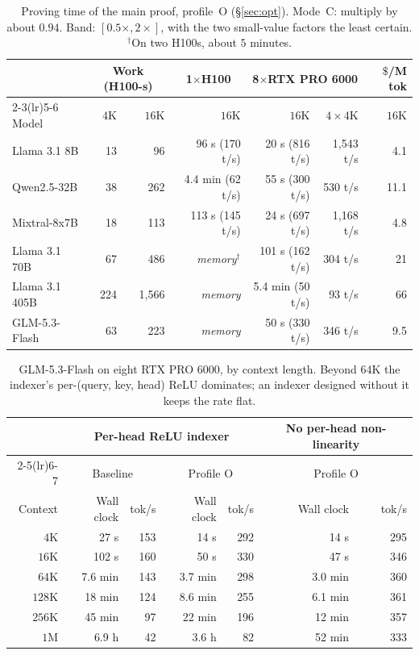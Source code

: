 \documentclass[11pt]{article}
\begin{document}
\begin{table}[h]
\centering\small
\begin{tabular}{@{}lrrrrrr@{}}
\toprule
& \multicolumn{2}{c}{Work (H100-s)} & \multicolumn{1}{c}{1\(\times\)H100} & \multicolumn{2}{c}{8\(\times\)RTX PRO 6000} & \(\$\)/M tok \\
\cmidrule(lr){2-3}\cmidrule(lr){5-6}
Model & \(4\)K & \(16\)K & \(16\)K & \(16\)K & \(4{\times}4\)K & \(16\)K \\
\midrule
Llama 3.1 8B & 13 & 96 & 96 s (170 t/s) & 20 s (816 t/s) & 1{,}543 t/s & 4.1 \\
Qwen2.5-32B & 38 & 262 & 4.4 min (62 t/s) & 55 s (300 t/s) & 530 t/s & 11.1 \\
Mixtral-8x7B & 18 & 113 & 113 s (145 t/s) & 24 s (697 t/s) & 1{,}168 t/s & 4.8 \\
Llama 3.1 70B & 67 & 486 & \emph{memory}\(^\dagger\) & 101 s (162 t/s) & 304 t/s & 21 \\
Llama 3.1 405B & 224 & 1{,}566 & \emph{memory} & 5.4 min (50 t/s) & 93 t/s & 66 \\
GLM-5.3-Flash & 63 & 223 & \emph{memory} & 50 s (330 t/s) & 346 t/s & 9.5 \\
\bottomrule
\end{tabular}
\caption{Proving time of the main proof, profile~O (\S\ref{sec:opt}). Mode~C: multiply by about \(0.94\). Band: \([0.5\times, 2\times]\), with the two small-value factors the least certain.
\(^\dagger\)On two H100s, about \(5\) minutes.}
\label{tab:proj-o}
\end{table}

\begin{table}[h]
\centering\small
\begin{tabular}{@{}rrrrrrr@{}}
\toprule
& \multicolumn{4}{c}{Per-head ReLU indexer} & \multicolumn{2}{c}{No per-head non-linearity} \\
\cmidrule(lr){2-5}\cmidrule(lr){6-7}
& \multicolumn{2}{c}{Baseline} & \multicolumn{2}{c}{Profile O} & \multicolumn{2}{c}{Profile O} \\
Context & Wall clock & tok/s & Wall clock & tok/s & Wall clock & tok/s \\
\midrule
\(4\)K & 27 s & 153 & 14 s & 292 & 14 s & 295 \\
\(16\)K & 102 s & 160 & 50 s & 330 & 47 s & 346 \\
\(64\)K & 7.6 min & 143 & 3.7 min & 298 & 3.0 min & 360 \\
\(128\)K & 18 min & 124 & 8.6 min & 255 & 6.1 min & 361 \\
\(256\)K & 45 min & 97 & 22 min & 196 & 12 min & 357 \\
\(1\)M & 6.9 h & 42 & 3.6 h & 82 & 52 min & 333 \\
\bottomrule
\end{tabular}
\caption{GLM-5.3-Flash on eight RTX PRO 6000, by context length. Beyond \(64\)K the indexer's per-(query, key, head) ReLU dominates; an indexer designed without it keeps the rate flat.}
\label{tab:glm}
\end{table}
\end{document}
